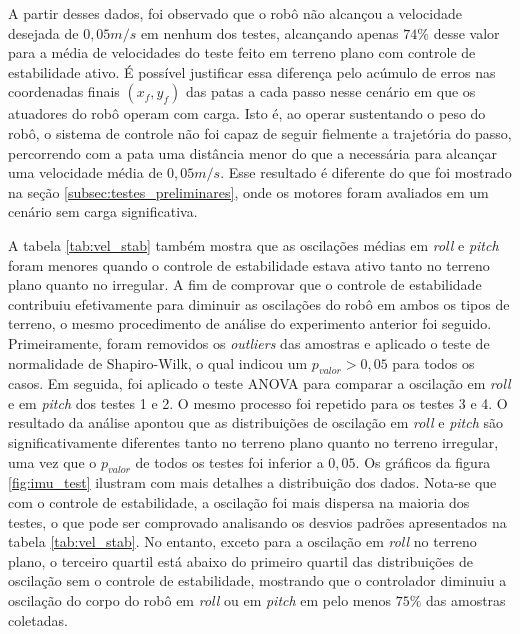 \documentclass[../main.tex]{subfiles}
\begin{document}
  A partir desses dados, foi observado que o robô não alcançou a velocidade desejada de $0,05 m/s$ em nenhum dos testes, alcançando apenas $74\%$ desse valor para a média de velocidades do teste feito em terreno plano com controle de estabilidade ativo. É possível justificar essa diferença pelo acúmulo de erros nas coordenadas finais $(x_f, y_f)$ das patas a cada passo nesse cenário em que os atuadores do robô operam com carga. Isto é, ao operar sustentando o peso do robô, o sistema de controle não foi capaz de seguir fielmente a trajetória do passo, percorrendo com a pata uma distância menor do que a necessária para alcançar uma velocidade média de $0,05 m/s$. Esse resultado é diferente do que foi mostrado na seção \ref{subsec:testes_preliminares}, onde os motores foram avaliados em um cenário sem carga significativa.
  
  A tabela \ref{tab:vel_stab} também mostra que as oscilações médias em \textit{roll} e \textit{pitch} foram menores quando o controle de estabilidade estava ativo tanto no terreno plano quanto no irregular. A fim de comprovar que o controle de estabilidade contribuiu efetivamente para diminuir as oscilações do robô em ambos os tipos de terreno, o mesmo procedimento de análise do experimento anterior foi seguido. Primeiramente, foram removidos os \textit{outliers} das amostras e aplicado o teste de normalidade de Shapiro-Wilk, o qual indicou um $p_{valor} > 0,05$ para todos os casos. Em seguida, foi aplicado o teste ANOVA para comparar a oscilação em \textit{roll} e em \textit{pitch} dos testes 1 e 2. O mesmo processo foi repetido para os testes 3 e 4. O resultado da análise apontou que as distribuições de oscilação em \textit{roll} e \textit{pitch} são significativamente diferentes tanto no terreno plano quanto no terreno irregular, uma vez que o $p_{valor}$ de todos os testes foi inferior a $0,05$. Os gráficos da figura \ref{fig:imu_test} ilustram com mais detalhes a distribuição dos dados. Nota-se que com o controle de estabilidade, a oscilação foi mais dispersa na maioria dos testes, o que pode ser comprovado analisando os desvios padrões apresentados na tabela \ref{tab:vel_stab}. No entanto, exceto para a oscilação em \textit{roll} no terreno plano, o terceiro quartil está abaixo do primeiro quartil das distribuições de oscilação sem o controle de estabilidade, mostrando que o controlador diminuiu a oscilação do corpo do robô em \textit{roll} ou em \textit{pitch} em pelo menos $75\%$ das amostras coletadas.

\end{document}
